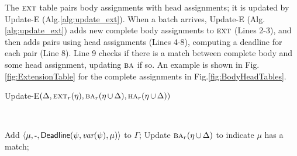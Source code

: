 The $\textsc{ext}$ table
pairs body assignments with head assignments;
it is updated by {\sf Update-E} (Alg.\:\ref{alg:update_ext}).
When a batch arrives,
{\sf Update-E} (Alg.\:\ref{alg:update_ext})
adds new complete body assignments to
$\textsc{ext}$ (Lines 2-3),
and then adds pairs using
head assignments (Lines 4-8),
computing a deadline for each pair (Line 8).
Line 9 checks if there is a match
between complete body and some head assignment,
updating $\BODY/$ if so.
An example is shown in Fig.\:\ref{fig:ExtensionTable}
for the complete assignments in Fig.\:\ref{fig:BodyHeadTables}.

\begin{algorithm}[t]
\caption{{\sf Update-E}$(\Delta, \EXT_r(\eta), \BODY/_r(\eta\tight\cup\Delta),
\HEAD/_r(\eta\tight\cup\Delta))$}
\label{alg:update_ext}
\begin{small}\vspace*{-2.5mm}
\begin{flushleft}
  \\
\end{flushleft}\vspace*{-3.5mm}
\begin{algorithmic}[1]
  \If{$\max(\mu)\tight=\tmsp_\Delta$}
  {Add $\langle \mu,\mbox{\small-},\textsf{Deadline}(\psi,\textit{var}(\psi),\mu)\rangle$ to $\Gamma$\:;}
  \EndIf
    \EndFor
      \If{$\max(\gamma)\tight=\tmsp_\Delta$}
          {Update $\BODY/_r(\eta\tight\cup\Delta)$ to indicate $\mu$ has a match\:;}
          \EndIf
        \EndIf
        \EndFor
      \EndIf
    \EndFor
    \hspace*{1in}
    \end{algorithmic}
  \end{small}
\end{algorithm}

